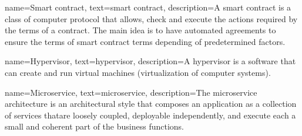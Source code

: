  {
name={Smart contract},
text={smart contract},
description={A smart contract is a class of computer protocol that allows, check and execute the actions required by the terms of a contract. The main idea is to have automated agreements to ensure the terms of smart contract terms depending of predetermined factors.}
}

 {
name={Hypervisor},
text={hypervisor},
description={A hypervisor is a software that can create and run virtual machines (virtualization of computer systems).}
}

 {
name={Microservice},
text={microservice},
description={The microservice architecture is an architectural style that composes an application as a collection of services thatare loosely coupled, deployable independently, and execute each a small and coherent part of the business functions.}
}
